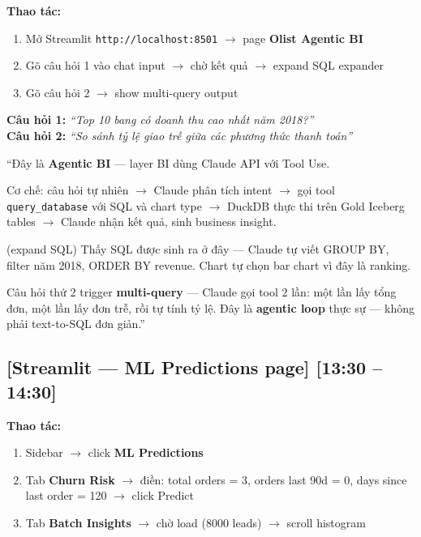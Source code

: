 \documentclass[12pt, a4paper]{article}
\newenvironment{speakerbox}[2]{%
  \begin{tcolorbox}[
    enhanced, breakable,
    colback=#1!6!white,
    colframe=#1,
    colbacktitle=#1,
    coltitle=white,
    fonttitle=\bfseries\large,
    title={#2},
    arc=4pt,
    boxrule=1.5pt,
    left=8pt, right=8pt, top=6pt, bottom=6pt,
  ]
}{%
  \end{tcolorbox}
}
\newcommand{\timing}[1]{%
  \hfill{\small\bfseries\color{gray}[#1]}%
}
\begin{document}
\begin{speakerbox}{p4color}{\faUser\ Người 4 · 9:00 -- 15:00}
\begin{demobox}
\textbf{Thao tác:}
\begin{enumerate}[leftmargin=1.5em, itemsep=2pt]
  \item Mở Streamlit \texttt{http://localhost:8501} $\to$ page \textbf{Olist Agentic BI}
  \item Gõ câu hỏi 1 vào chat input $\to$ chờ kết quả $\to$ expand SQL expander
  \item Gõ câu hỏi 2 $\to$ show multi-query output
\end{enumerate}

\textbf{Câu hỏi 1:} \textit{``Top 10 bang có doanh thu cao nhất năm 2018?''}\\
\textbf{Câu hỏi 2:} \textit{``So sánh tỷ lệ giao trễ giữa các phương thức thanh toán''}
\end{demobox}

\begin{scriptbox}
``Đây là \textbf{Agentic BI} --- layer BI dùng Claude API với Tool Use.

Cơ chế: câu hỏi tự nhiên $\to$ Claude phân tích intent $\to$ gọi tool
\texttt{query\_database} với SQL và chart type $\to$ DuckDB thực thi trên
Gold Iceberg tables $\to$ Claude nhận kết quả, sinh business insight.

(expand SQL) Thấy SQL được sinh ra ở đây --- Claude tự viết GROUP BY,
filter năm 2018, ORDER BY revenue. Chart tự chọn bar chart vì đây là ranking.

Câu hỏi thứ 2 trigger \textbf{multi-query} --- Claude gọi tool 2 lần: một lần
lấy tổng đơn, một lần lấy đơn trễ, rồi tự tính tỷ lệ. Đây là \textbf{agentic loop}
thực sự --- không phải text-to-SQL đơn giản.''
\end{scriptbox}

\subsection*{[Streamlit — ML Predictions page] \timing{13:30 -- 14:30}}

\begin{demobox}
\textbf{Thao tác:}
\begin{enumerate}[leftmargin=1.5em, itemsep=2pt]
  \item Sidebar $\to$ click \textbf{ML Predictions}
  \item Tab \textbf{Churn Risk} $\to$ điền: total orders = 3, orders last 90d = 0,
        days since last order = 120 $\to$ click Predict
  \item Tab \textbf{Batch Insights} $\to$ chờ load (8000 leads) $\to$ scroll histogram
\end{enumerate}
\end{demobox}


\end{speakerbox}
\end{document}
